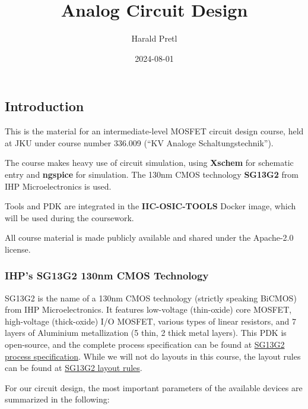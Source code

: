 \documentclass[
  a4paper,
  DIV=11,
  numbers=noendperiod]{scrartcl}
\title{Analog Circuit Design}
\author{Harald Pretl}
\date{2024-08-01}
\renewcommand*\contentsname{Table of contents}
\newcommand\contentsname{Table of contents}
\begin{document}
\maketitle

\renewcommand*\contentsname{Table of contents}
{
\hypersetup{linkcolor=}
\setcounter{tocdepth}{3}
\tableofcontents
}

\subsection{Introduction}\label{sec-intro}

This is the material for an intermediate-level MOSFET circuit design
course, held at JKU under course number 336.009 (``KV Analoge
Schaltungstechnik'').

The course makes heavy use of circuit simulation, using \textbf{Xschem}
for schematic entry and \textbf{ngspice} for simulation. The 130nm CMOS
technology \textbf{SG13G2} from IHP Microelectronics is used.

Tools and PDK are integrated in the \textbf{IIC-OSIC-TOOLS} Docker
image, which will be used during the coursework.

All course material is made publicly available and shared under the
Apache-2.0 license.

\subsubsection{IHP's SG13G2 130nm CMOS
Technology}\label{ihps-sg13g2-130nm-cmos-technology}

SG13G2 is the name of a 130nm CMOS technology (strictly speaking BiCMOS)
from IHP Microelectronics. It features low-voltage (thin-oxide) core
MOSFET, high-voltage (thick-oxide) I/O MOSFET, various types of linear
resistors, and 7 layers of Aluminium metallization (5 thin, 2 thick
metal layers). This PDK is open-source, and the complete process
specification can be found at
\href{https://github.com/IHP-GmbH/IHP-Open-PDK/blob/main/ihp-sg13g2/libs.doc/doc/SG13G2_os_process_spec.pdf}{SG13G2
process specification}. While we will not do layouts in this course, the
layout rules can be found at
\href{https://github.com/IHP-GmbH/IHP-Open-PDK/blob/main/ihp-sg13g2/libs.doc/doc/SG13G2_os_layout_rules.pdf}{SG13G2
layout rules}.

For our circuit design, the most important parameters of the available
devices are summarized in the following:
\end{document}
